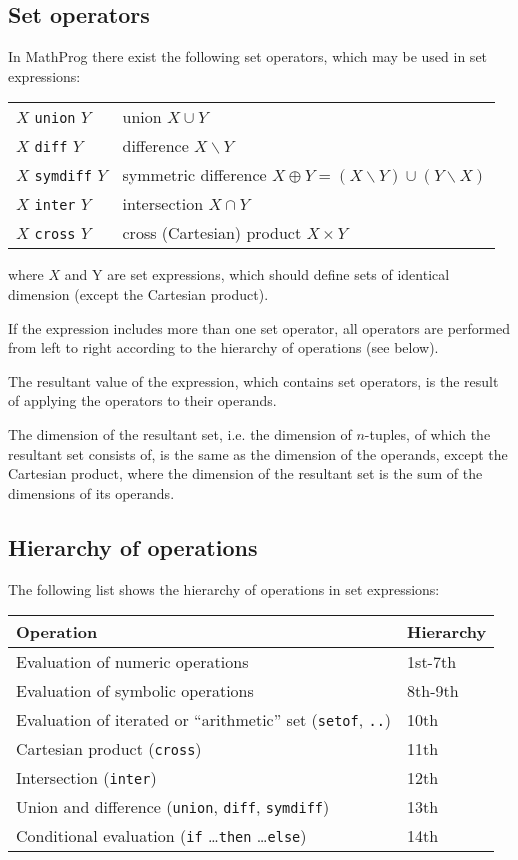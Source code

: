 \documentclass[11pt]{report}
\begin{document}
\newpage

\subsection{Set operators}

In MathProg there exist the following set operators, which may be used
in set expressions:

\begin{tabular}{@{}ll@{}}
$X$ {\tt union} $Y$&union $X\cup Y$\\
$X$ {\tt diff} $Y$&difference $X\backslash Y$\\
$X$ {\tt symdiff} $Y$&symmetric difference
$X\oplus Y=(X\backslash Y)\cup(Y\backslash X)$\\
$X$ {\tt inter} $Y$&intersection $X\cap Y$\\
$X$ {\tt cross} $Y$&cross (Cartesian) product $X\times Y$\\
\end{tabular}

\noindent where $X$ and Y are set expressions, which should define sets
of identical dimension (except the Cartesian product).

If the expression includes more than one set operator, all operators
are performed from left to right according to the hierarchy of
operations (see below).

The resultant value of the expression, which contains set operators, is
the result of applying the operators to their operands.

The dimension of the resultant set, i.e. the dimension of $n$-tuples,
of which the resultant set consists of, is the same as the dimension of
the operands, except the Cartesian product, where the dimension of the
resultant set is the sum of the dimensions of its operands.

\subsection{Hierarchy of operations}

The following list shows the hierarchy of operations in set
expressions:

\noindent\hfil
\begin{tabular}{@{}ll@{}}
Operation&Hierarchy\\
\hline
Evaluation of numeric operations&1st-7th\\
Evaluation of symbolic operations&8th-9th\\
Evaluation of iterated or ``arithmetic'' set ({\tt setof}, {\tt..})&
10th\\
Cartesian product ({\tt cross})&11th\\
Intersection ({\tt inter})&12th\\
Union and difference ({\tt union}, {\tt diff}, {\tt symdiff})&13th\\
Conditional evaluation ({\tt if} \dots {\tt then} \dots {\tt else})&
14th\\
\end{tabular}
\end{document}
